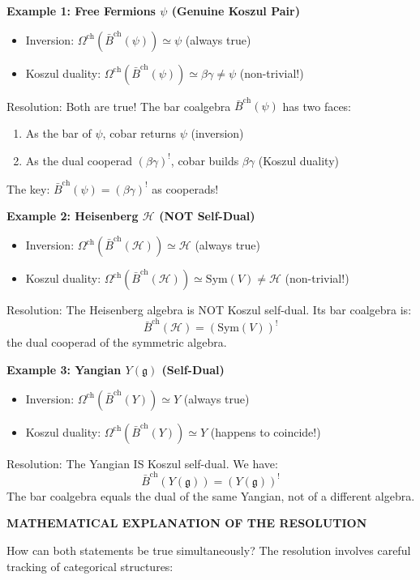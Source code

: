 \begin{remark}
\textbf{Example 1: Free Fermions $\psi$ (Genuine Koszul Pair)}
\begin{itemize}
\item Inversion: $\Omega^{\text{ch}}(\bar{B}^{\text{ch}}(\psi)) \simeq \psi$ \checkmark \quad (always true)
\item Koszul duality: $\Omega^{\text{ch}}(\bar{B}^{\text{ch}}(\psi)) \simeq \beta\gamma \neq \psi$ \checkmark \quad (non-trivial!)
\end{itemize}
Resolution: Both are true! The bar coalgebra $\bar{B}^{\text{ch}}(\psi)$ has two faces:
\begin{enumerate}
\item As the bar of $\psi$, cobar returns $\psi$ (inversion)
\item As the dual cooperad $(\beta\gamma)^!$, cobar builds $\beta\gamma$ (Koszul duality)
\end{enumerate}
The key: $\bar{B}^{\text{ch}}(\psi) = (\beta\gamma)^!$ as cooperads!

\textbf{Example 2: Heisenberg $\mathcal{H}$ (NOT Self-Dual)}
\begin{itemize}
\item Inversion: $\Omega^{\text{ch}}(\bar{B}^{\text{ch}}(\mathcal{H})) \simeq \mathcal{H}$ \checkmark \quad (always true)
\item Koszul duality: $\Omega^{\text{ch}}(\bar{B}^{\text{ch}}(\mathcal{H})) \simeq \text{Sym}(V) \neq \mathcal{H}$ \checkmark \quad (non-trivial!)
\end{itemize}
Resolution: The Heisenberg algebra is NOT Koszul self-dual. Its bar coalgebra is:
$$\bar{B}^{\text{ch}}(\mathcal{H}) = (\text{Sym}(V))^!$$
the dual cooperad of the symmetric algebra.

\textbf{Example 3: Yangian $Y(\mathfrak{g})$ (Self-Dual)}
\begin{itemize}
\item Inversion: $\Omega^{\text{ch}}(\bar{B}^{\text{ch}}(Y)) \simeq Y$ \checkmark \quad (always true)
\item Koszul duality: $\Omega^{\text{ch}}(\bar{B}^{\text{ch}}(Y)) \simeq Y$ \checkmark \quad (happens to coincide!)
\end{itemize}
Resolution: The Yangian IS Koszul self-dual. We have:
$$\bar{B}^{\text{ch}}(Y(\mathfrak{g})) = (Y(\mathfrak{g}))^!$$
The bar coalgebra equals the dual of the same Yangian, not of a different algebra.

\medskip
\noindent\textbf{MATHEMATICAL EXPLANATION OF THE RESOLUTION}

How can both statements be true simultaneously? The resolution involves careful tracking of categorical structures:


\end{remark}
